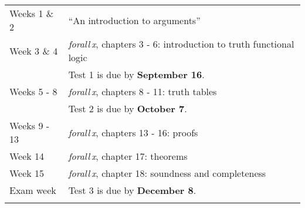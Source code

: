 
\begin{sffamily}
\begin{scriptsize}
\begin{tabular}{@{}ll@{}}
\arrayrulecolor{blue1}\hline
\textcolor{blue1}{Weeks 1 \& 2} & ``An introduction to arguments''\\
\textcolor{blue1}{Week 3 \& 4} & \textit{forall\,x}, chapters 3 - 6: introduction to truth functional logic\\

&Test 1 is due by \textcolor{blue1}{\textbf{September 16}}.\\
\textcolor{blue1}{Weeks 5 - 8} & \textit{forall\,x}, chapters 8 - 11: truth tables\\

&Test 2 is due by \textcolor{blue1}{\textbf{October 7}}.\\
\textcolor{blue1}{Weeks 9 - 13} & \textit{forall\,x}, chapters 13 - 16: proofs\\
\textcolor{blue1}{Week 14} & \textit{forall\,x}, chapter 17: theorems\\
\textcolor{blue1}{Week 15} & \textit{forall\,x}, chapter 18: soundness and completeness\\
\textcolor{blue1}{Exam week} & Test 3 is due by \textcolor{blue1}{\textbf{December 8}}.\\
\arrayrulecolor{blue1}\hline
\end{tabular}
\end{scriptsize}
\end{sffamily}